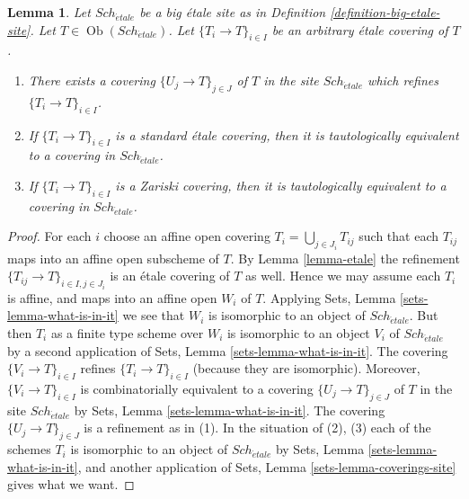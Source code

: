 \documentclass{stacks-project}
\theoremstyle{plain}
\newtheorem{lemma}[subsection]{Lemma}
\theoremstyle{definition}
\theoremstyle{remark}
\numberwithin{equation}{subsection}
\def\Sch{\mathit{Sch}}
\def\Ob{\mathop{\mathrm{Ob}}\nolimits}
\def\etale{{\acute{e}tale}}
\begin{document}
\begin{lemma}
\label{lemma-etale-induced}
Let $\Sch_\etale$ be a big \'etale site as in
Definition \ref{definition-big-etale-site}.
Let $T \in \Ob(\Sch_\etale)$.
Let $\{T_i \to T\}_{i \in I}$ be an arbitrary \'etale covering of $T$.
\begin{enumerate}
\item There exists a covering $\{U_j \to T\}_{j \in J}$ of $T$ in the site
$\Sch_\etale$ which refines $\{T_i \to T\}_{i \in I}$.
\item If $\{T_i \to T\}_{i \in I}$ is a standard \'etale covering, then
it is tautologically equivalent to a covering in $\Sch_\etale$.
\item If $\{T_i \to T\}_{i \in I}$ is a Zariski covering, then
it is tautologically equivalent to a covering in $\Sch_\etale$.
\end{enumerate}
\end{lemma}

\begin{proof}
For each $i$ choose an affine open covering $T_i = \bigcup_{j \in J_i} T_{ij}$
such that each $T_{ij}$ maps into an affine open subscheme of $T$. By
Lemma \ref{lemma-etale}
the refinement $\{T_{ij} \to T\}_{i \in I, j \in J_i}$ is an \'etale covering
of $T$ as well. Hence we may assume each $T_i$ is affine, and maps into
an affine open $W_i$ of $T$. Applying
Sets, Lemma \ref{sets-lemma-what-is-in-it}
we see that $W_i$ is isomorphic to an object of $\Sch_\etale$.
But then $T_i$ as a finite type scheme over $W_i$
is isomorphic to an object $V_i$ of $\Sch_\etale$ by a second
application of
Sets, Lemma \ref{sets-lemma-what-is-in-it}.
The covering $\{V_i \to T\}_{i \in I}$ refines $\{T_i \to T\}_{i \in I}$
(because they are isomorphic).
Moreover, $\{V_i \to T\}_{i \in I}$ is combinatorially equivalent to a
covering $\{U_j \to T\}_{j \in J}$ of $T$ in the site
$\Sch_\etale$ by
Sets, Lemma \ref{sets-lemma-what-is-in-it}.
The covering $\{U_j \to T\}_{j \in J}$ is a refinement as in (1).
In the situation of (2), (3) each of the
schemes $T_i$ is isomorphic to an object of $\Sch_\etale$ by
Sets, Lemma \ref{sets-lemma-what-is-in-it},
and another application of
Sets, Lemma \ref{sets-lemma-coverings-site}
gives what we want.
\end{proof}
\end{document}
